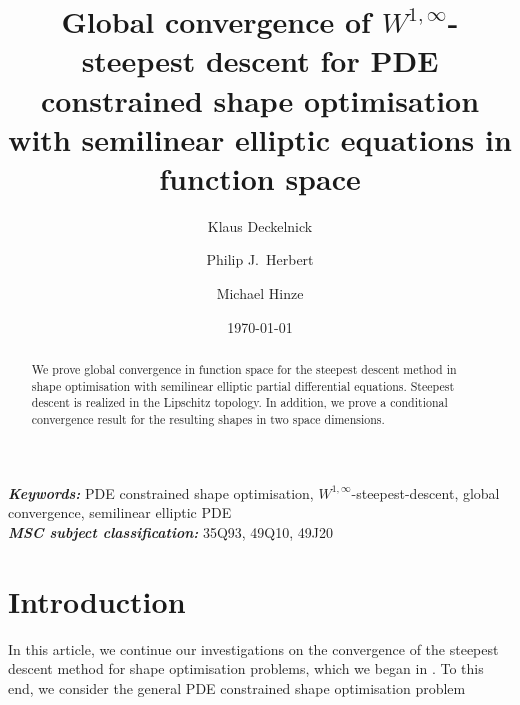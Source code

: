 \documentclass[a4paper,10pt]{article}
\theoremstyle{plain}
\theoremstyle{plain}
\numberwithin{equation}{section}
\providecommand{\keywords}[1]{\textbf{\textit{Keywords:}} #1}
\providecommand{\subjclass}[1]{\textbf{\textit{MSC subject classification:}} #1}
\begin{document}
\title{Global convergence of $W^{1,\infty}$-steepest descent for PDE constrained shape optimisation with semilinear elliptic equations in function space}
\author[1]{Klaus Deckelnick}
\author[2]{Philip J.~Herbert}
\author[3]{Michael Hinze%
}
\date{\today}


\maketitle
\begin{abstract}
We prove global convergence in function space for the steepest descent
method in shape optimisation with semilinear elliptic partial
differential equations. Steepest descent is realized in the Lipschitz
topology. In addition, we prove a conditional convergence result for the
resulting shapes in two space dimensions.
\end{abstract}

\noindent\keywords{PDE constrained shape optimisation, 
$W^{1,\infty}$-steepest-descent, global convergence, semilinear elliptic PDE} \\[2mm]
\noindent\subjclass{ 35Q93, 49Q10, 49J20}
\\
\renewcommand{\thefootnote}{\arabic{footnote}}

\section{Introduction}\label{intro}
In this article, we continue our investigations on the convergence of the steepest descent method for shape optimisation problems, which we began in \cite{DHH25-convergence}. To this end, we consider the general PDE constrained shape optimisation problem 
\end{document}
